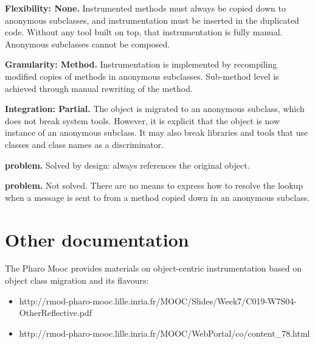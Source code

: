 \documentclass[10pt,twoside,english]{_support/latex/sbabook/sbabook}
\begin{document}
\textbf{Flexibility: None.} Instrumented methods must always be copied down to anonymous subclasses, and instrumentation must be inserted in the duplicated code. Without any tool built on top, that instrumentation is fully manual. Anonymous subclasses cannot be composed.

\textbf{Granularity: Method.} Instrumentation is implemented by recompiling modified copies of methods in anonymous subclasses. Sub-method level is achieved through manual rewriting of the method.

\textbf{Integration: Partial.} The object is migrated to an anonymous subclass, which does not break system tools. However, it is explicit that the object is now instance of an anonymous subclass. It may also break libraries and tools that use classes and class names as a discriminator.

\textbf{ problem.} Solved by design:  always references the original object.

\textbf{ problem.} Not solved. There are no means to express how to resolve the lookup when a message is sent to  from a method copied down in an anonymous subclass.
\section{Other documentation}
The Pharo Mooc provides materials on object-centric instrumentation based on object class migration and its flavours:

\begin{itemize}
\item http://rmod-pharo-mooc.lille.inria.fr/MOOC/Slides/Week7/C019-W7S04-OtherReflective.pdf
\item http://rmod-pharo-mooc.lille.inria.fr/MOOC/WebPortal/co/content\_78.html
\end{itemize}






\backmatter

\end{document}

